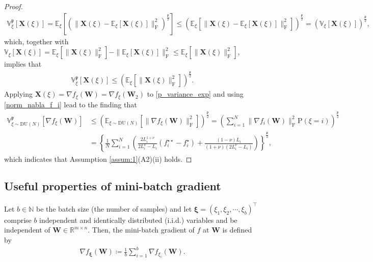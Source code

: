 \documentclass[twoside,11pt]{article}
\begin{document}
\begin{proof}
\begin{align*}
\mathbb{V}_{\xi}^{\mathfrak{p}}[\bm{X}(\xi)]
=
\mathbb{E}_\xi \left[ \left( \| \bm{X}(\xi) - \mathbb{E}_\xi [\bm{X}(\xi)] \|_{\mathrm{F}}^{2} \right)^{\frac{\mathfrak{p}}{2}} \right]
\leq 
\left( \mathbb{E}_\xi [ \| \bm{X}(\xi) - \mathbb{E}_\xi [\bm{X}(\xi)] \|_{\mathrm{F}}^{2} ] \right)^{\frac{\mathfrak{p}}{2}}
= \left( \mathbb{V}_{\xi}[\bm{X}(\xi)] \right)^{\frac{\mathfrak{p}}{2}},
\end{align*}
which, together with $\mathbb{V}_{\xi}[\bm{X}(\xi)] = \mathbb{E}_{\xi}[\| \bm{X}(\xi)\|_{\mathrm{F}}^2] - \|\mathbb{E}_{\xi}[ \bm{X}(\xi)]\|_{\mathrm{F}}^2 \leq \mathbb{E}_{\xi}[\| \bm{X}(\xi)\|_{\mathrm{F}}^2]$, implies that
\begin{align}\label{p_variance_exp}
\mathbb{V}_{\xi}^{\mathfrak{p}}[\bm{X}(\xi)]
\leq \left( \mathbb{E}_{\xi}[\| \bm{X}(\xi)\|_{\mathrm{F}}^2] \right)^{\frac{\mathfrak{p}}{2}}.
\end{align} 
Applying $\bm{X}(\xi) = \nabla f_\xi (\bm{W}) = \nabla f_\xi (\bm{W}_2)$ to \eqref{p_variance_exp} and using \eqref{norm_nabla_f_i} lead to the finding that 
\begin{align*}
\mathbb{V}_{\xi \sim \mathrm{DU}(N)}^{\mathfrak{p}}[\nabla f_\xi (\bm{W})]
&\leq \left( \mathbb{E}_{\xi \sim \mathrm{DU}(N)}[\| \nabla f_\xi (\bm{W})\|_{\mathrm{F}}^2] \right)^{\frac{\mathfrak{p}}{2}}
= \left( \sum_{i=1}^N \|\nabla f_i (\bm{W})\|_{\mathrm{F}}^2 \mathrm{P}(\xi = i)   \right)^{\frac{\mathfrak{p}}{2}}\\
&= \left\{ \frac{1}{N} \sum_{i=1}^N
\left( \frac{2 L_i^{1 + \nu}}{2 L_i^\nu - L_i} (f_i^{\star\star} - f_i^{\star})
+ 
\frac{(1 - \nu) L_i}{(1 + \nu)(2 L_i^\nu - L_i)} 
\right) \right\}^{\frac{\mathfrak{p}}{2}},
\end{align*}
which indicates that Assumption \ref{assum:1}(A2)(ii) holds. 
\end{proof}

\subsection{Useful properties of mini-batch gradient}
Let $b \in \mathbb{N}$ be the batch size (the number of samples) and let $\bm{\xi} = (\xi_{1}, \xi_{2}, \cdots, \xi_{b})^\top$ comprise $b$ independent and identically distributed (i.i.d.) variables and be independent of $\bm{W} \in \mathbb{R}^{m \times n}$. Then, the mini-batch gradient of $f$ at $\bm{W}$ is defined by
\begin{align}\label{mini_batch}
\nabla f_{\bm{\xi}}(\bm{W}) \coloneqq 
\frac{1}{b} \sum_{i=1}^b \nabla f_{\xi_{i}}(\bm{W}).
\end{align} 
\end{document}
